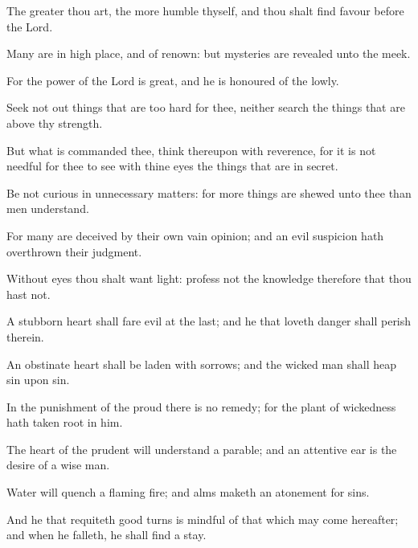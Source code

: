 {\par }{\PP {}The greater thou art, the more humble thyself, and thou shalt find favour before the Lord.
\par }{\PP {}Many are in high place, and of renown: but mysteries are revealed unto the meek.
\par }{\PP {}For the power of the Lord is great, and he is honoured of the lowly.
\par }{\PP {}Seek not out things that are too hard for thee, neither search the things that are above thy strength.
\par }{\PP {}But what is commanded thee, think thereupon with reverence, for it is not needful for thee to see with thine eyes the things that are in secret.
\par }{\PP {}Be not curious in unnecessary matters: for more things are shewed unto thee than men understand.
\par }{\PP {}For many are deceived by their own vain opinion; and an evil suspicion hath overthrown their judgment.
\par }{\PP {}Without eyes thou shalt want light: profess not the knowledge therefore that thou hast not.
\par }{\PP {}A stubborn heart shall fare evil at the last; and he that loveth danger shall perish therein.
\par }{\PP {}An obstinate heart shall be laden with sorrows; and the wicked man shall heap sin upon sin.
\par }{\PP {}In the punishment of the proud there is no remedy; for the plant of wickedness hath taken root in him.
\par }{\PP {}The heart of the prudent will understand a parable; and an attentive ear is the desire of a wise man.
\par }{\PP {}Water will quench a flaming fire; and alms maketh an atonement for sins.
\par }{\PP {}And he that requiteth good turns is mindful of that which may come hereafter; and when he falleth, he shall find a stay.

}
